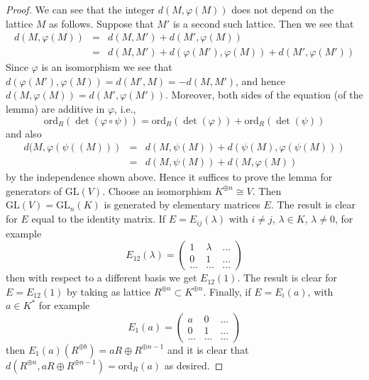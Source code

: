\begin{proof}
We can see that the integer $d(M, \varphi(M))$ does not depend
on the lattice $M$ as follows. Suppose that $M'$ is a second such
lattice. Then we see that
\begin{eqnarray*}
d(M, \varphi(M)) & = & d(M, M') + d(M', \varphi(M)) \\
& = & d(M, M') + d(\varphi(M'), \varphi(M)) + d(M', \varphi(M'))
\end{eqnarray*}
Since $\varphi$ is an isomorphism we see that
$d(\varphi(M'), \varphi(M)) = d(M', M) = -d(M, M')$, and hence
$d(M, \varphi(M)) = d(M', \varphi(M'))$. Moreover, both sides of the
equation (of the lemma) are additive in $\varphi$, i.e.,
$$
\text{ord}_R(\det(\varphi \circ \psi))
=
\text{ord}_R(\det(\varphi))
+
\text{ord}_R(\det(\psi))
$$
and also
\begin{eqnarray*}
d(M, \varphi(\psi((M))) & = &
d(M, \psi(M)) + d(\psi(M), \varphi(\psi(M))) \\
& = & d(M, \psi(M)) + d(M, \varphi(M))
\end{eqnarray*}
by the independence shown above. Hence it suffices to prove the lemma
for generators of $\text{GL}(V)$. Choose an isomorphism
$K^{\oplus n} \cong V$. Then $\text{GL}(V) = \text{GL}_n(K)$ is
generated by elementary matrices $E$.
The result is clear for $E$ equal to the identity matrix.
If $E = E_{ij}(\lambda)$ with $i \not = j$, $\lambda \in K$,
$\lambda \not = 0$, for example
$$
E_{12}(\lambda) =
\left(
\begin{matrix}
1 & \lambda & \ldots \\
0 & 1 & \ldots \\
\ldots & \ldots & \ldots
\end{matrix}
\right)
$$
then with respect to a different basis we get $E_{12}(1)$.
The result is clear for $E = E_{12}(1)$ by taking as lattice
$R^{\oplus n} \subset K^{\oplus n}$. Finally, if $E = E_i(a)$,
with $a \in K^*$ for example
$$
E_1(a) =
\left(
\begin{matrix}
a & 0 & \ldots \\
0 & 1 & \ldots \\
\ldots & \ldots & \ldots
\end{matrix}
\right)
$$
then $E_1(a)(R^{\oplus b}) = aR \oplus R^{\oplus n - 1}$ and
it is clear that $d(R^{\oplus n}, aR \oplus R^{\oplus n - 1})
= \text{ord}_R(a)$ as desired.
\end{proof}

